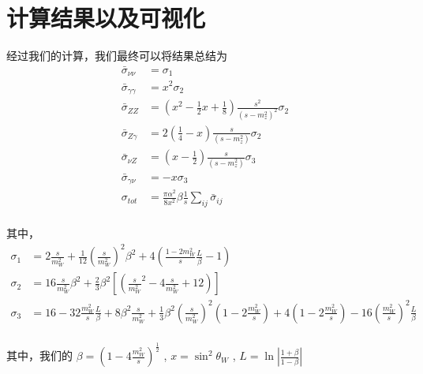 \documentclass{article}
\begin{document}
\section{计算结果以及可视化}

经过我们的计算，我们最终可以将结果总结为\cite{commins1985weak}
\begin{align*}
    \bar{\sigma}_{\nu\nu} &= \sigma_1 \\
    \bar{\sigma}_{\gamma\gamma} &= x^2 \sigma_2\\
    \bar{\sigma}_{ZZ} &= \left(x^2 - \frac{1}{2}x + \frac{1}{8}\right)\frac{s^2}{\left(s - m_z^2\right)^2}\sigma_2\\
    \bar{\sigma}_{Z\gamma} &= 2\left(\frac{1}{4} - x\right)\frac{s}{\left(s - m_z^2\right)}\sigma_2\\
    \bar{\sigma}_{\nu Z} &= \left(x - \frac{1}{2}\right)\frac{s}{\left(s - m_z^2\right)}\sigma_3\\
    \bar{\sigma}_{\gamma \nu} &= -x\sigma_3\\
    \sigma_{tot} &= \frac{\pi \alpha^2}{8 x^2} \beta \frac{1}{s} \sum_{ij}\bar{\sigma}_{ij} \\
\end{align*}

其中，
\begin{align*}
    \sigma_1 &= 2 \frac{s}{m_W^2} + \frac{1}{12} \left(\frac{s}{m_W^2}\right)^2 \beta^2 + 4\left(\frac{1 - 2 m_W^2}{s}\frac{L}{\beta} - 1\right) \\
    \sigma_2 &= 16 \frac{s}{m_W^2}\beta^2 + \frac{2}{3} \beta^2 \left[\left(\frac{s}{m_W^2}^2 - 4\frac{s}{m_W^2} + 12\right)\right] \\
    \sigma_3 &= 16 - 32 \frac{m_W^2}{s} \frac{L}{\beta} + 8\beta^2 \frac{s}{m_W^2} + \frac{1}{3} \beta^2\left(\frac{s}{m_W^2}\right)^2 \left(1 - 2\frac{m_W^2}{s}\right) + 4\left(1 - 2\frac{m_W^2}{s}\right) - 16\left(\frac{m_W^2}{s}\right)^2\frac{L}{\beta} \\
\end{align*}

其中，我们的 $\displaystyle \beta = \left(1 - 4 \frac{m_W^2}{s}\right)^{\frac{1}{2}}$ , $\displaystyle x = \sin^2\theta_W$ , $\displaystyle L = \ln\left|\frac{1 + \beta}{1 - \beta}\right|$






\newpage

\begin{center}
    \nocite{Veltman_1994}
    \nocite{Peskin:1995ev}
    \nocite{Paschos_2023a}
\end{center}
\end{document}
